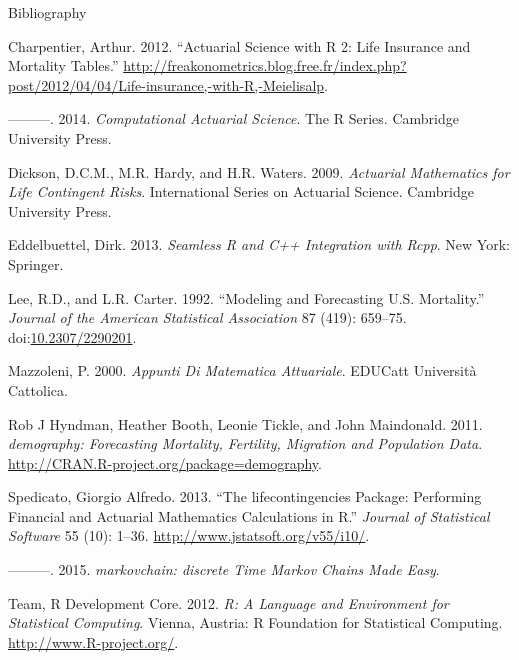 \documentclass[ignorenonframetext,]{beamer}
\begin{document}
\begin{frame}[allowframebreaks]{Bibliography}

Charpentier, Arthur. 2012. ``Actuarial Science with R 2: Life Insurance
and Mortality Tables.''
\url{http://freakonometrics.blog.free.fr/index.php?post/2012/04/04/Life-insurance,-with-R,-Meielisalp}.

---------. 2014. \emph{Computational Actuarial Science}. The R Series.
Cambridge University Press.

Dickson, D.C.M., M.R. Hardy, and H.R. Waters. 2009. \emph{Actuarial
Mathematics for Life Contingent Risks}. International Series on
Actuarial Science. Cambridge University Press.

Eddelbuettel, Dirk. 2013. \emph{Seamless R and C++ Integration with
Rcpp}. New York: Springer.

Lee, R.D., and L.R. Carter. 1992. ``Modeling and Forecasting U.S.
Mortality.'' \emph{Journal of the American Statistical Association} 87
(419): 659--75.
doi:\href{http://dx.doi.org/10.2307/2290201}{10.2307/2290201}.

Mazzoleni, P. 2000. \emph{Appunti Di Matematica Attuariale}. EDUCatt
Università Cattolica.

Rob J Hyndman, Heather Booth, Leonie Tickle, and John Maindonald. 2011.
\emph{demography: Forecasting Mortality, Fertility, Migration and
Population Data}. \url{http://CRAN.R-project.org/package=demography}.

Spedicato, Giorgio Alfredo. 2013. ``The lifecontingencies Package:
Performing Financial and Actuarial Mathematics Calculations in R.''
\emph{Journal of Statistical Software} 55 (10): 1--36.
\url{http://www.jstatsoft.org/v55/i10/}.

---------. 2015. \emph{markovchain: discrete Time Markov Chains Made
Easy}.

Team, R Development Core. 2012. \emph{R: A Language and Environment for
Statistical Computing}. Vienna, Austria: R Foundation for Statistical
Computing. \url{http://www.R-project.org/}.

\end{frame}
\end{document}
